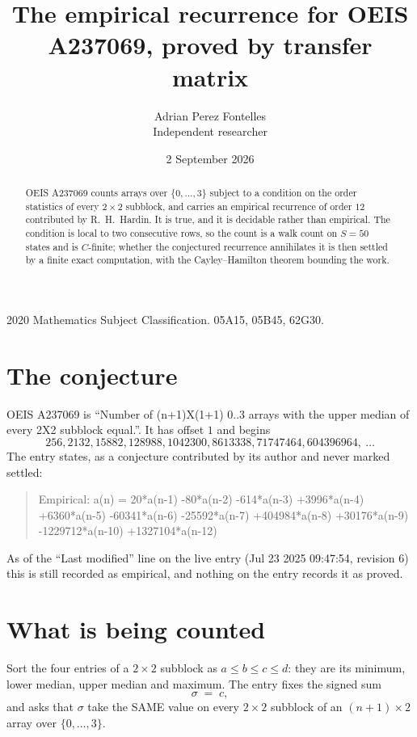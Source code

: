\documentclass[11pt,a4paper]{article}
\title{The empirical recurrence for OEIS A237069, proved by transfer matrix}
\author{Adrian Perez Fontelles\\ \small Independent researcher}
\date{2 September 2026}
\theoremstyle{plain}
\theoremstyle{definition}
\begin{document}
\maketitle

\begin{abstract}
OEIS A237069 counts arrays over $\{0,\dots,3\}$ subject to a condition on the order
statistics of every $2\times2$ subblock, and carries an empirical recurrence of order
$12$ contributed by R.~H.~Hardin. It is true, and it is decidable rather than empirical.
The condition is local to two consecutive rows, so the count is a walk count on $S=50$
states and is $C$-finite; whether the conjectured recurrence annihilates it is then settled by
a finite exact computation, with the Cayley--Hamilton theorem bounding the work.
\end{abstract}

\noindent\small 2020 Mathematics Subject Classification. 05A15, 05B45, 62G30.\normalsize

\section{The conjecture}

OEIS A237069 is ``Number of (n+1)X(1+1) 0..3 arrays with the upper median of every 2X2 subblock equal.''. It has offset $1$ and begins
\[
256, 2132, 15882, 128988, 1042300, 8613338, 71747464, 604396964,\ \dots
\]
The entry states, as a conjecture contributed by its author and never marked settled:
\begin{quote}
Empirical: a(n) = 20*a(n-1) -80*a(n-2) -614*a(n-3) +3996*a(n-4) +6360*a(n-5) -60341*a(n-6) -25592*a(n-7) +404984*a(n-8) +30176*a(n-9) -1229712*a(n-10) +1327104*a(n-12)
\end{quote}
As of the ``Last modified'' line on the live entry (Jul 23 2025 09:47:54, revision 6) this is still
recorded as empirical, and nothing on the entry records it as proved.

\section{What is being counted}

Sort the four entries of a $2\times2$ subblock as $a\le b\le c\le d$: they
are its minimum, lower median, upper median and maximum. The entry fixes the signed sum
\[
\sigma\;=\;c,
\]
and asks that $\sigma$ take the SAME value on every $2\times2$ subblock of an
$(n+1)\times2$ array over $\{0,\dots,3\}$.
\end{document}
